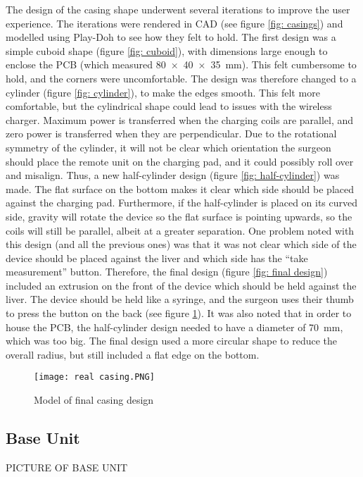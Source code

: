The design of the casing shape underwent several iterations to improve the user experience. The iterations were rendered in CAD (see figure \ref{fig: casings}) and modelled using Play-Doh to see how they felt to hold. The first design was a simple cuboid shape (figure \ref{fig: cuboid}), with dimensions large enough to enclose the PCB (which measured \SI{80x40x35}{\milli\metre}). This felt cumbersome to hold, and the corners were uncomfortable. The design was therefore changed to a cylinder (figure \ref{fig: cylinder}), to make the edges smooth. This felt more comfortable, but the cylindrical shape could lead to issues with the wireless charger. Maximum power is transferred when the charging coils are parallel, and zero power is transferred when they are perpendicular. Due to the rotational symmetry of the cylinder, it will not be clear which orientation the surgeon should place the remote unit on the charging pad, and it could possibly roll over and misalign. Thus, a new half-cylinder design (figure \ref{fig: half-cylinder}) was made. The flat surface on the bottom makes it clear which side should be placed against the charging pad. Furthermore, if the half-cylinder is placed on its curved side, gravity will rotate the device so the flat surface is pointing upwards, so the coils will still be parallel, albeit at a greater separation. One problem noted with this design (and all the previous ones) was that it was not clear which side of the device should be placed against the liver and which side has the ``take measurement'' button. Therefore, the final design (figure \ref{fig: final design}) included an extrusion on the front of the device which should be held against the liver. The device should be held like a syringe, and the surgeon uses their thumb to press the button on the back (see figure \ref{fig: real casing}). It was also noted that in order to house the PCB, the half-cylinder design needed to have a diameter of \SI{70}{\milli\metre}, which was too big. The final design used a more circular shape to reduce the overall radius, but still included a flat edge on the bottom.

\begin{figure}[htb]
	\centering
	\texttt{[image: real casing.PNG]}
	\caption{Model of final casing design}
	\label{fig: real casing}
\end{figure}





\subsection{Base Unit}\label{base casing}
PICTURE OF BASE UNIT\\

